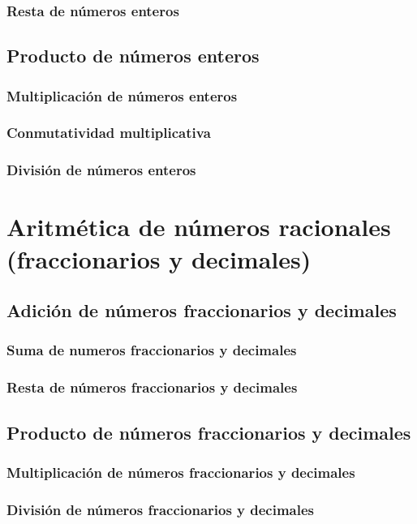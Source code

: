 \documentclass[12pt]{book}
\begin{document}
\begin{mainmatter}
    \subsubsection{Resta de n\'umeros enteros}
    \subsection{Producto de n\'umeros enteros}
    \subsubsection{Multiplicación de números enteros}
    \subsubsection{Conmutatividad multiplicativa}
    \subsubsection{División de números enteros}

    \section{Aritmética de números racionales (fraccionarios y decimales)}

    \subsection{Adición de n\'umeros fraccionarios y decimales}
    \subsubsection{Suma de numeros fraccionarios y decimales}
    \subsubsection{Resta de n\'umeros fraccionarios y decimales}
    \subsection{Producto de n\'umeros fraccionarios y decimales}
    \subsubsection{Multiplicación de números fraccionarios y decimales}
    \subsubsection{División de números fraccionarios y decimales}


\end{mainmatter}
\end{document}
